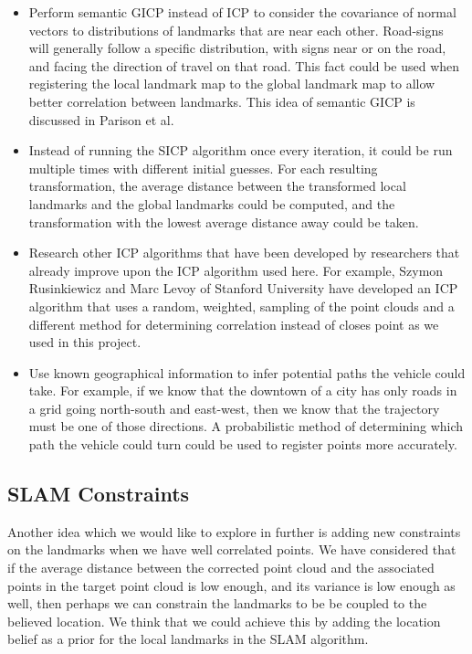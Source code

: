 \documentclass[letterpaper, 10 pt, conference]{ieeeconf}  %
\begin{document}
\begin{itemize}
\item Perform semantic GICP instead of ICP to consider the covariance of normal vectors to distributions of landmarks that are near each other. Road-signs will generally follow a specific distribution, with signs near or on the road, and facing the direction of travel on that road. This fact could be used when registering the local landmark map to the global landmark map to allow better correlation between landmarks. This idea of semantic GICP is discussed in Parison et al. \cite{cGICP}
\item Instead of running the SICP algorithm once every iteration, it could be run multiple times with different initial guesses. For each resulting transformation, the average distance between the transformed local landmarks and the global landmarks could be computed, and the transformation with the lowest average distance away could be taken.
\item Research other ICP algorithms that have been developed by researchers that already improve upon the ICP algorithm used here. For example, Szymon Rusinkiewicz and Marc Levoy of Stanford University \cite{ref:futurework} have developed an ICP algorithm that uses a random, weighted, sampling of the point clouds and a different method for determining correlation instead of closes point as we used in this project.
\item Use known geographical information to infer potential paths the vehicle could take. For example, if we know that the downtown of a city has only roads in a grid going north-south and east-west, then we know that the trajectory must be one of those directions. A probabilistic method of determining which path the vehicle could turn could be used to register points more accurately.
\end{itemize}

\subsection{SLAM Constraints}
Another idea which we would like to explore in further is adding new constraints on the landmarks when we have well correlated points.  We have considered that if the average distance between the corrected point cloud and the associated points in the target point cloud is low enough, and its variance is low enough as well, then perhaps we can constrain the landmarks to be be coupled to the believed location.  We think that we could achieve this by adding the location belief as a prior for the local landmarks in the SLAM algorithm.
\end{document}
